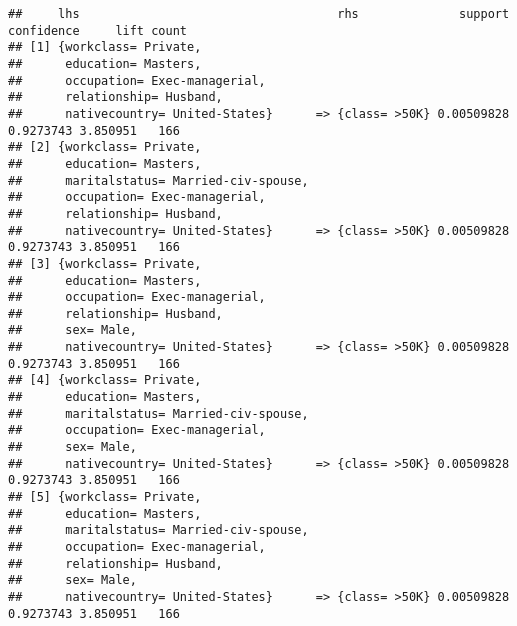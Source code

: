 \documentclass[]{article}
\begin{document}
\begin{verbatim}
##     lhs                                    rhs              support confidence     lift count
## [1] {workclass= Private,                                                                     
##      education= Masters,                                                                     
##      occupation= Exec-managerial,                                                            
##      relationship= Husband,                                                                  
##      nativecountry= United-States}      => {class= >50K} 0.00509828  0.9273743 3.850951   166
## [2] {workclass= Private,                                                                     
##      education= Masters,                                                                     
##      maritalstatus= Married-civ-spouse,                                                      
##      occupation= Exec-managerial,                                                            
##      relationship= Husband,                                                                  
##      nativecountry= United-States}      => {class= >50K} 0.00509828  0.9273743 3.850951   166
## [3] {workclass= Private,                                                                     
##      education= Masters,                                                                     
##      occupation= Exec-managerial,                                                            
##      relationship= Husband,                                                                  
##      sex= Male,                                                                              
##      nativecountry= United-States}      => {class= >50K} 0.00509828  0.9273743 3.850951   166
## [4] {workclass= Private,                                                                     
##      education= Masters,                                                                     
##      maritalstatus= Married-civ-spouse,                                                      
##      occupation= Exec-managerial,                                                            
##      sex= Male,                                                                              
##      nativecountry= United-States}      => {class= >50K} 0.00509828  0.9273743 3.850951   166
## [5] {workclass= Private,                                                                     
##      education= Masters,                                                                     
##      maritalstatus= Married-civ-spouse,                                                      
##      occupation= Exec-managerial,                                                            
##      relationship= Husband,                                                                  
##      sex= Male,                                                                              
##      nativecountry= United-States}      => {class= >50K} 0.00509828  0.9273743 3.850951   166
\end{verbatim}
\end{document}

